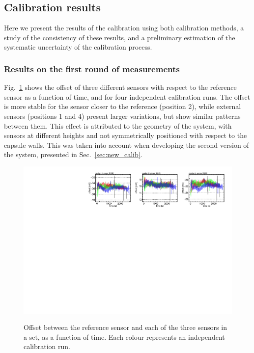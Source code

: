 
\subsection{Calibration results}
\label{sec:calib_results}
\noindent Here we present the results of the calibration using both calibration methods, a study of the consistency of these results, and a preliminary estimation of the systematic uncertainty of the calibration process.

\subsubsection{Results on the first round of measurements}
\noindent Fig.~\ref{fi:CAL_offset_example} shows the offset of three different sensors with respect to the reference sensor as a function of time, and for four independent calibration runs. The offset is more stable for the sensor closer to the reference (position 2), while external sensors (positions 1 and 4) present larger variations, but show similar patterns between them. This effect is attributed to the geometry of the system, with sensors at different heights and not symmetrically positioned with respect to the capsule walls. This was taken into account when developing the second version of the system, presented in Sec.~\ref{sec:new_calib}.

\label{sec:results_first_round}
\begin{figure}[htbp]
\centering
{\includegraphics[width=\textwidth]{images/figure_10.pdf}}
\caption{Offset between the reference sensor and each of the three sensors in a set, as a function of time. Each colour represents an independent calibration run.}
\label{fi:CAL_offset_example}
\end{figure}

